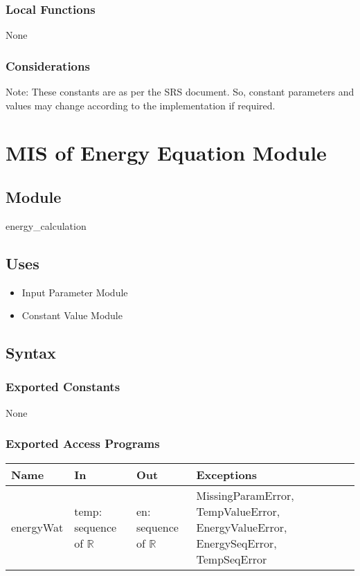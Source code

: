 \documentclass[12pt, titlepage]{article}
\begin{document}
\subsubsection{Local Functions}

None

\subsubsection{Considerations}
Note: These constants are as per the SRS document. So, constant parameters and values may change according to the implementation if required.  


\section{MIS of Energy Equation Module} \label{Energy_Equation_Module} 

\subsection{Module}

energy\_calculation

\subsection{Uses}

\begin{itemize}
    \item Input Parameter Module
    \item Constant Value Module
\end{itemize}

\subsection{Syntax}

\subsubsection{Exported Constants}
None

\subsubsection{Exported Access Programs}

\begin{center}
\begin{tabular}{p{1.9cm} p{5cm} p{4cm} p{3.5cm}}
\hline
\textbf{Name} & \textbf{In} & \textbf{Out} & \textbf{Exceptions} \\
\hline
energyWat & temp: sequence of $\mathbb{R}$ & en: sequence of $\mathbb{R}$ & MissingParamError, TempValueError, EnergyValueError, EnergySeqError, TempSeqError \\ 
\hline
\end{tabular}
\end{center}
\end{document}
